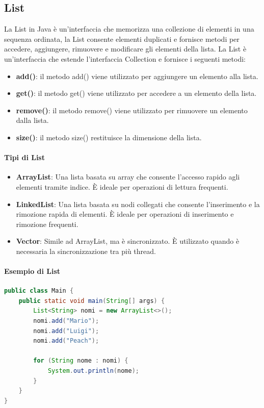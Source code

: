 \documentclass[11pt]{article}
\begin{document}
\subsection{List}
La List in Java è un'interfaccia che memorizza una collezione di elementi in una sequenza ordinata,
la List consente elementi duplicati e fornisce metodi per accedere, aggiungere, rimuovere e modificare gli elementi della lista.
La List è un'interfaccia che estende l'interfaccia Collection e fornisce i seguenti metodi:
\begin{itemize}
    \item \textbf{add()}: il metodo add() viene utilizzato per aggiungere un elemento alla lista.
    \item \textbf{get()}: il metodo get() viene utilizzato per accedere a un elemento della lista.
    \item \textbf{remove()}: il metodo remove() viene utilizzato per rimuovere un elemento dalla lista.
    \item \textbf{size()}: il metodo size() restituisce la dimensione della lista.
    \end{itemize}
\paragraph{Tipi di List}
\begin{itemize}
    \item \textbf{ArrayList}: Una lista basata su array che consente l'accesso rapido agli elementi tramite indice. È ideale per operazioni di lettura frequenti.
    \item \textbf{LinkedList}: Una lista basata su nodi collegati che consente l'inserimento e la rimozione rapida di elementi. È ideale per operazioni di inserimento e rimozione frequenti.
    \item \textbf{Vector}: Simile ad ArrayList, ma è sincronizzato. È utilizzato quando è necessaria la sincronizzazione tra più thread.
    \end{itemize}
\paragraph{Esempio di List}
\begin{lstlisting}[language=Java]
public class Main {
    public static void main(String[] args) {
        List<String> nomi = new ArrayList<>();
        nomi.add("Mario");
        nomi.add("Luigi");
        nomi.add("Peach");

        for (String nome : nomi) {
            System.out.println(nome);
        }
    }
}
\end{lstlisting}
\end{document}
